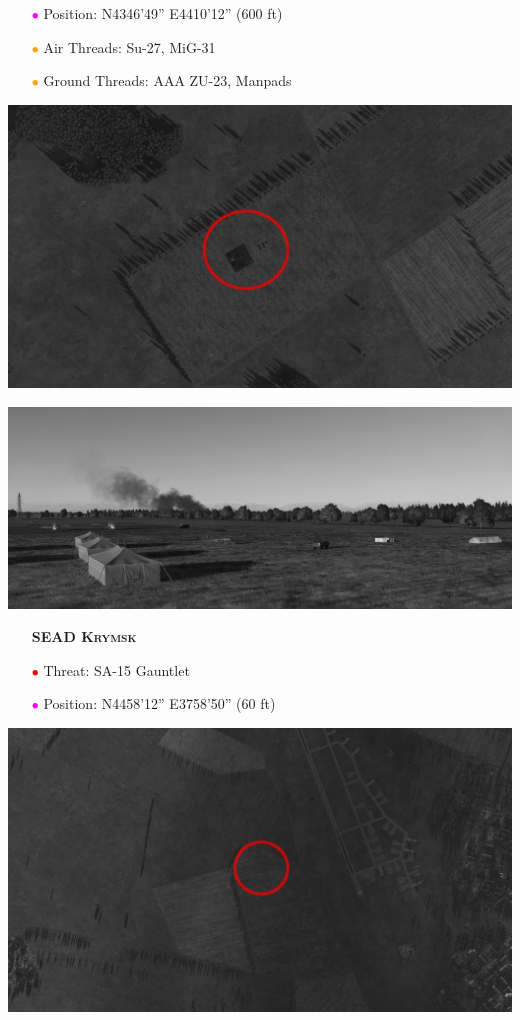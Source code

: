 \documentclass[a4paper,12pt,dvipsnames]{letter}
\newcommand{\Deg}{\textdegree{}}
\newcommand{\DMS}[3]{#1\Deg#2'#3''}
\newcommand{\myHead}[1]{{\LARGE\textsc{\textbf{#1}}}}
\newcommand{\ri}{\textcolor{Red}{$\bullet$\;}}
\newcommand{\mi}{\textcolor{Magenta}{$\bullet$\;}}
\newcommand{\oi}{\textcolor{Orange}{$\bullet$\;}}
\begin{document}
{\begin{itemize}
 \item[\mi] Position: N\DMS{43}{46}{49} E\DMS{44}{10}{12} (600 ft)
 \item[\oi] Air Threads: Su-27, MiG-31
 \item[\oi] Ground Threads: AAA ZU-23, Manpads
\end{itemize}
\begin{center}
 \includegraphics[width=0.7\linewidth]{../_kneeboard/FARP_Skala_Sat.png}
\end{center}
%
\begin{center}
 \includegraphics[width=0.7\linewidth]{../_kneeboard/FARP_Skala_Pic.png}
\end{center}
%
\vspace{0.5em}
\newpage
\begin{itemize}
 \item[] \myHead{SEAD Krymsk}
 \item[\ri] Threat: SA-15 Gauntlet
 \item[\mi] Position: N\DMS{44}{58}{12} E\DMS{37}{58}{50} (60 ft)
\end{itemize}
%
\begin{center}
\includegraphics[width=0.7\linewidth]{../_kneeboard/SA15_Sat.png}

\end{center}}
\end{document}
